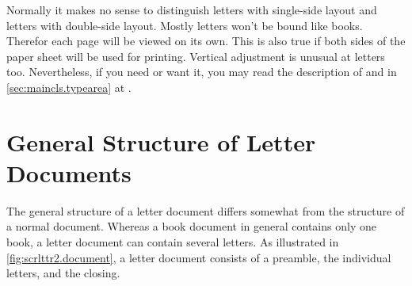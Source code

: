 Normally it makes no sense to distinguish letters with single-side layout and
letters with double-side layout. Mostly letters won't be bound like
books. Therefor each page will be viewed on its own. This is also true if both
sides of the paper sheet will be used for printing. Vertical adjustment is
unusual at letters too. Nevertheless, if you need or want it, you may read the
description of  and  in
\autoref{sec:maincls.typearea} at .%
%


\section{General Structure of Letter Documents}
\label{sec:scrlttr2.document}

The general structure of a letter document differs somewhat from the
structure of a normal document. Whereas a book document in general
contains only one book, a letter document can contain several
letters. As illustrated in \autoref{fig:scrlttr2.document}, a letter
document consists of a preamble, the individual letters, and the
closing.

